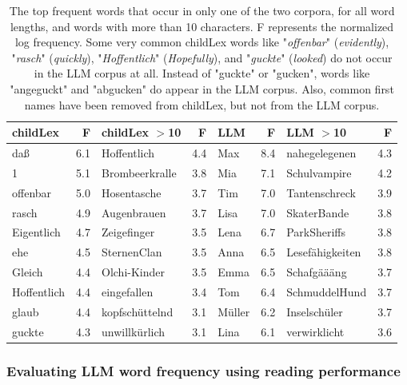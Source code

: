 \documentclass[doc, a4paper, anonymous]{apa7}
\begin{document}
\begin{table}[!htbp]
\caption{The top frequent words that occur in only one of the two corpora, for all word lengths, and words with more than 10 characters. F represents the normalized log frequency. Some very common childLex words like "\textit{offenbar}" (\textit{evidently}), "\textit{rasch}" (\textit{quickly}), "\textit{Hoffentlich}" (\textit{Hopefully}), and "\textit{guckte}" (\textit{looked}) do not occur in the LLM corpus at all. Instead of "guckte" or "gucken", words like "angeguckt" and "abgucken" do appear in the LLM corpus. Also, common first names have been removed from childLex, but not from the LLM corpus.}
\centering
\begin{tabular}{lrlrlrlr}
  \hline
childLex & F & childLex $>$10 & F & LLM & F & LLM $>$10 & F \\ 
  \hline
daß & 6.1 & Hoffentlich & 4.4 & Max & 8.4 & nahegelegenen & 4.3 \\ 
  1 & 5.1 & Brombeerkralle & 3.8 & Mia & 7.1 & Schulvampire & 4.2 \\ 
  offenbar & 5.0 & Hosentasche & 3.7 & Tim & 7.0 & Tantenschreck & 3.9 \\ 
  rasch & 4.9 & Augenbrauen & 3.7 & Lisa & 7.0 & SkaterBande & 3.8 \\ 
  Eigentlich & 4.7 & Zeigefinger & 3.5 & Lena & 6.7 & ParkSheriffs & 3.8 \\ 
  ehe & 4.5 & SternenClan & 3.5 & Anna & 6.5 & Lesefähigkeiten & 3.8 \\ 
  Gleich & 4.4 & Olchi-Kinder & 3.5 & Emma & 6.5 & Schafgäääng & 3.7 \\ 
  Hoffentlich & 4.4 & eingefallen & 3.4 & Tom & 6.4 & SchmuddelHund & 3.7 \\ 
  glaub & 4.4 & kopfschüttelnd & 3.1 & Müller & 6.2 & Inselschüler & 3.7 \\ 
  guckte & 4.3 & unwillkürlich & 3.1 & Lina & 6.1 & verwirklicht & 3.6 \\ 
   \hline
\end{tabular}
\label{notin}
\end{table}




\subsubsection*{Evaluating LLM word frequency using reading performance}
\end{document}
